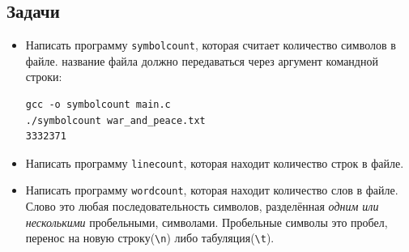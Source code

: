 \documentclass{article}
\begin{document}
\subsection*{Задачи}
\begin{itemize}
\item Написать программу \texttt{symbolcount}, которая считает количество символов в файле. название файла должно передаваться через аргумент командной строки:\\
\begin{verbatim}
gcc -o symbolcount main.c
./symbolcount war_and_peace.txt
3332371
\end{verbatim}
\item Написать программу \texttt{linecount}, которая находит количество строк в файле.
\item Написать программу \texttt{wordcount}, которая находит количество слов в файле. Слово это любая последовательность символов, разделённая \textit{одним или несколькими} пробельными, символами. Пробельные символы это пробел, перенос на новую строку(\texttt{\textbackslash n}) либо табуляция(\texttt{\textbackslash t}).
\end{itemize}
\end{document}
